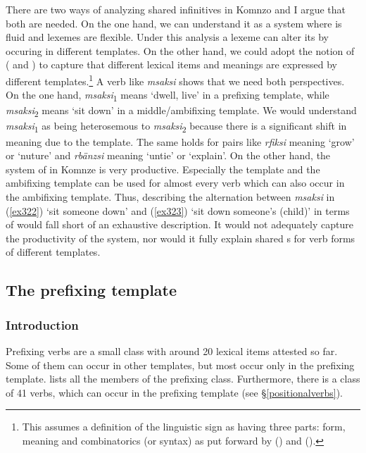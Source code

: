 There are two ways of analyzing shared infinitives in Komnzo and I argue that both are needed. On the one hand, we can understand it as a system where  is fluid and lexemes are flexible. Under this analysis a lexeme can alter its  by occuring in different templates. On the other hand, we could adopt the notion of  (\citealt{Lichtenberk:1991ic} and \citealt[524]{Evans:2012we}) to capture that different lexical items and meanings are expressed by different templates.\footnote{This assumes a definition of the linguistic sign as having three parts: form, meaning and combinatorics (or syntax) as put forward by (\citealt{Melcuk:1973vu}) and (\citealt[51]{Pollard:1987wu}).} A verb like \emph{msaksi} shows that we need both perspectives. On the one hand, \emph{msaksi}\textsubscript{1} means `dwell, live' in a prefixing template, while \emph{msaksi}\textsubscript{2} means `sit down' in a middle/ambifixing template. We would understand \emph{msaksi}\textsubscript{1} as being heterosemous to \emph{msaksi}\textsubscript{2} because there is a significant shift in meaning due to the template. The same holds for pairs like \emph{rfiksi} meaning `grow' or `nuture' and \emph{rbänzsi} meaning `untie' or `explain'. On the other hand, the system of  in Komnze is very productive. Especially the  template and the  ambifixing template can be used for almost every verb which can also occur in the  ambifixing template. Thus, describing the alternation between \emph{msaksi} in (\ref{ex322}) `sit someone down' and (\ref{ex323}) `sit down someone's (child)' in terms of  would fall short of an exhaustive description. It would not adequately capture the productivity of the system, nor would it fully explain shared s for verb forms of different templates.

\subsection{The prefixing template} \label{prefixingverbsec}

\subsubsection{Introduction}

Prefixing verbs are a small class with around 20 lexical items attested so far. Some of them can occur in other templates, but most occur only in the prefixing template.  lists all the members of the prefixing class. Furthermore, there is a class of 41  verbs, which can occur in the prefixing template (see \S{}\ref{positionalverbs}).

